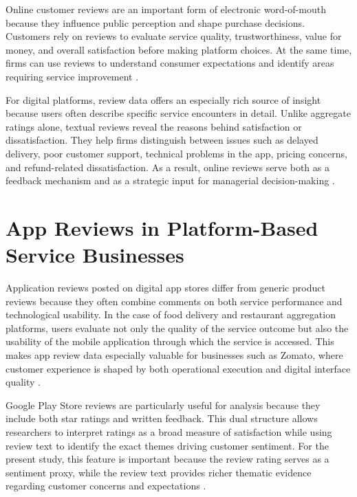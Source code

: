 Online customer reviews are an important form of electronic word-of-mouth because they influence public perception and shape purchase decisions. Customers rely on reviews to evaluate service quality, trustworthiness, value for money, and overall satisfaction before making platform choices. At the same time, firms can use reviews to understand consumer expectations and identify areas requiring service improvement \cite{chevalier2006,mudambi2010,filieri2015,park2009}.

For digital platforms, review data offers an especially rich source of insight because users often describe specific service encounters in detail. Unlike aggregate ratings alone, textual reviews reveal the reasons behind satisfaction or dissatisfaction. They help firms distinguish between issues such as delayed delivery, poor customer support, technical problems in the app, pricing concerns, and refund-related dissatisfaction. As a result, online reviews serve both as a feedback mechanism and as a strategic input for managerial decision-making \cite{mudambi2010,filieri2015}.

\section{App Reviews in Platform-Based Service Businesses}

Application reviews posted on digital app stores differ from generic product reviews because they often combine comments on both service performance and technological usability. In the case of food delivery and restaurant aggregation platforms, users evaluate not only the quality of the service outcome but also the usability of the mobile application through which the service is accessed. This makes app review data especially valuable for businesses such as Zomato, where customer experience is shaped by both operational execution and digital interface quality \cite{pagano2013,guzman2017,martin2017}.

Google Play Store reviews are particularly useful for analysis because they include both star ratings and written feedback. This dual structure allows researchers to interpret ratings as a broad measure of satisfaction while using review text to identify the exact themes driving customer sentiment. For the present study, this feature is important because the review rating serves as a sentiment proxy, while the review text provides richer thematic evidence regarding customer concerns and expectations \cite{pagano2013,martin2017}.

